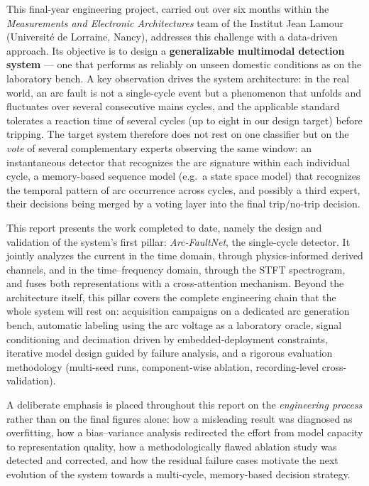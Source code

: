 This final-year engineering project, carried out over six months within the \emph{Measurements and Electronic Architectures} team of the Institut Jean Lamour (Université de Lorraine, Nancy), addresses this challenge with a data-driven approach. Its objective is to design a \textbf{generalizable multimodal detection system} --- one that performs as reliably on unseen domestic conditions as on the laboratory bench. A key observation drives the system architecture: in the real world, an arc fault is not a single-cycle event but a phenomenon that unfolds and fluctuates over several consecutive mains cycles, and the applicable standard tolerates a reaction time of several cycles (up to eight in our design target) before tripping. The target system therefore does not rest on one classifier but on the \emph{vote} of several complementary experts observing the same window: an instantaneous detector that recognizes the arc signature within each individual cycle, a memory-based sequence model (e.g.\ a state space model) that recognizes the temporal pattern of arc occurrence across cycles, and possibly a third expert, their decisions being merged by a voting layer into the final trip/no-trip decision.

\medskip

This report presents the work completed to date, namely the design and validation of the system's first pillar: \emph{Arc-FaultNet}, the single-cycle detector. It jointly analyzes the current in the time domain, through physics-informed derived channels, and in the time--frequency domain, through the STFT spectrogram, and fuses both representations with a cross-attention mechanism. Beyond the architecture itself, this pillar covers the complete engineering chain that the whole system will rest on: acquisition campaigns on a dedicated arc generation bench, automatic labeling using the arc voltage as a laboratory oracle, signal conditioning and decimation driven by embedded-deployment constraints, iterative model design guided by failure analysis, and a rigorous evaluation methodology (multi-seed runs, component-wise ablation, recording-level cross-validation).

\medskip

A deliberate emphasis is placed throughout this report on the \emph{engineering process} rather than on the final figures alone: how a misleading result was diagnosed as overfitting, how a bias--variance analysis redirected the effort from model capacity to representation quality, how a methodologically flawed ablation study was detected and corrected, and how the residual failure cases motivate the next evolution of the system towards a multi-cycle, memory-based decision strategy.

